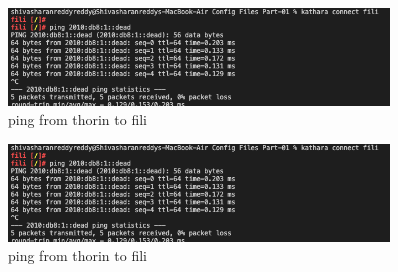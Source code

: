 \begin{figure}[H]
\centering
  \includegraphics[width=0.9\textwidth]{images/Ping from fili to thorin .png}
  \caption{ping from thorin to fili}
  \label{fig: 1.2}
\end{figure}

\begin{figure}[H]
\centering
  \includegraphics[width=0.9\textwidth]{images/Ping from fili to thorin .png}
  \caption{ping from thorin to fili}
  \label{fig: 1.3}
\end{figure}
